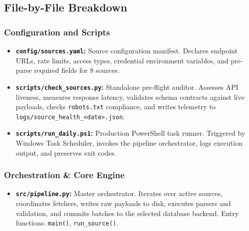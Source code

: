 \documentclass[10pt,letterpaper]{article}
\begin{document}
\subsection{File-by-File Breakdown}

\subsubsection{Configuration and Scripts}
\begin{itemize}[leftmargin=1.5em]
    \item \textbf{\texttt{config/sources.yaml}:} Source configuration manifest. Declares endpoint URLs, rate limits, access types, credential environment variables, and pre-parse required fields for 8 sources.
    \item \textbf{\texttt{scripts/check\_sources.py}:} Standalone pre-flight auditor. Assesses API liveness, measures response latency, validates schema contracts against live payloads, checks \texttt{robots.txt} compliance, and writes telemetry to \texttt{logs/source\_health\_<date>.json}.
    \item \textbf{\texttt{scripts/run\_daily.ps1}:} Production PowerShell task runner. Triggered by Windows Task Scheduler, invokes the pipeline orchestrator, logs execution output, and preserves exit codes.
\end{itemize}

\subsubsection{Orchestration \& Core Engine}
\begin{itemize}[leftmargin=1.5em]
    \item \textbf{\texttt{src/pipeline.py}:} Master orchestrator. Iterates over active sources, coordinates fetchers, writes raw payloads to disk, executes parsers and validation, and commits batches to the selected database backend. Entry functions: \texttt{main()}, \texttt{run\_source()}.
\end{itemize}
\end{document}
